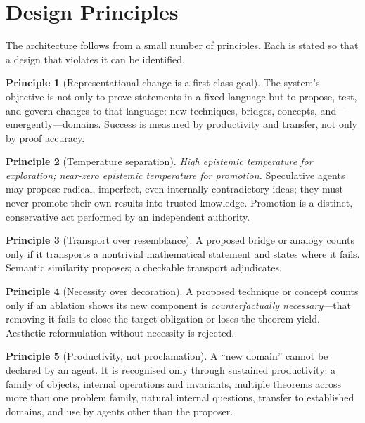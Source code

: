 \documentclass[11pt]{article}
\theoremstyle{definition}
\newtheorem{principle}{Principle}
\theoremstyle{remark}
\begin{document}
\section{Design Principles}
\label{sec:principles}

The architecture follows from a small number of principles. Each is stated so that a design that
violates it can be identified.

\begin{principle}[Representational change is a first-class goal]
\label{prin:repr}
The system's objective is not only to prove statements in a fixed language but to propose, test, and
govern changes to that language: new techniques, bridges, concepts, and---emergently---domains.
Success is measured by productivity and transfer, not only by proof accuracy.
\end{principle}

\begin{principle}[Temperature separation]
\label{prin:temp}
\emph{High epistemic temperature for exploration; near-zero epistemic temperature for promotion.}
Speculative agents may propose radical, imperfect, even internally contradictory ideas; they must
never promote their own results into trusted knowledge. Promotion is a distinct, conservative act
performed by an independent authority.
\end{principle}

\begin{principle}[Transport over resemblance]
\label{prin:transport}
A proposed bridge or analogy counts only if it transports a nontrivial mathematical statement and
states where it fails. Semantic similarity proposes; a checkable transport adjudicates.
\end{principle}

\begin{principle}[Necessity over decoration]
\label{prin:necessity}
A proposed technique or concept counts only if an ablation shows its new component is
\emph{counterfactually necessary}---that removing it fails to close the target obligation or loses
the theorem yield. Aesthetic reformulation without necessity is rejected.
\end{principle}

\begin{principle}[Productivity, not proclamation]
\label{prin:productivity}
A ``new domain'' cannot be declared by an agent. It is recognised only through sustained
productivity: a family of objects, internal operations and invariants, multiple theorems across
more than one problem family, natural internal questions, transfer to established domains, and use
by agents other than the proposer.
\end{principle}
\end{document}
